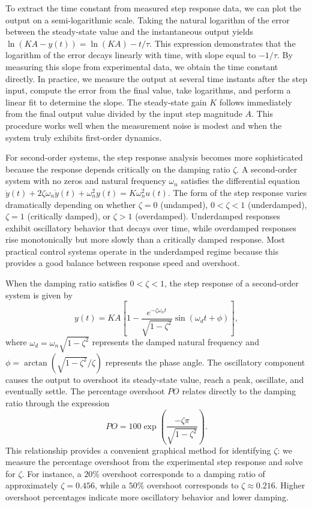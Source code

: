 To extract the time constant from measured step response data, we can plot the output on a semi-logarithmic scale. Taking the natural logarithm of the error between the steady-state value and the instantaneous output yields $\ln(KA - y(t)) = \ln(KA) - t/\tau$. This expression demonstrates that the logarithm of the error decays linearly with time, with slope equal to $-1/\tau$. By measuring this slope from experimental data, we obtain the time constant directly. In practice, we measure the output at several time instants after the step input, compute the error from the final value, take logarithms, and perform a linear fit to determine the slope. The steady-state gain $K$ follows immediately from the final output value divided by the input step magnitude $A$. This procedure works well when the measurement noise is modest and when the system truly exhibits first-order dynamics.

For second-order systems, the step response analysis becomes more sophisticated because the response depends critically on the damping ratio $\zeta$. A second-order system with no zeros and natural frequency $\omega_n$ satisfies the differential equation $\ddot{y}(t) + 2\zeta\omega_n\dot{y}(t) + \omega_n^2 y(t) = K\omega_n^2 u(t)$. The form of the step response varies dramatically depending on whether $\zeta = 0$ (undamped), $0 < \zeta < 1$ (underdamped), $\zeta = 1$ (critically damped), or $\zeta > 1$ (overdamped). Underdamped responses exhibit oscillatory behavior that decays over time, while overdamped responses rise monotonically but more slowly than a critically damped response. Most practical control systems operate in the underdamped regime because this provides a good balance between response speed and overshoot.

When the damping ratio satisfies $0 < \zeta < 1$, the step response of a second-order system is given by
\[
y(t) = KA\left[1 - \frac{e^{-\zeta\omega_n t}}{\sqrt{1-\zeta^2}}\sin\left(\omega_d t + \phi\right)\right],
\]
where $\omega_d = \omega_n\sqrt{1-\zeta^2}$ represents the damped natural frequency and $\phi = \arctan\left(\sqrt{1-\zeta^2}/\zeta\right)$ represents the phase angle. The oscillatory component causes the output to overshoot its steady-state value, reach a peak, oscillate, and eventually settle. The percentage overshoot $PO$ relates directly to the damping ratio through the expression
\[
PO = 100\exp\left(\frac{-\zeta\pi}{\sqrt{1-\zeta^2}}\right).
\]
This relationship provides a convenient graphical method for identifying $\zeta$: we measure the percentage overshoot from the experimental step response and solve for $\zeta$. For instance, a $20\%$ overshoot corresponds to a damping ratio of approximately $\zeta = 0.456$, while a $50\%$ overshoot corresponds to $\zeta \approx 0.216$. Higher overshoot percentages indicate more oscillatory behavior and lower damping.

